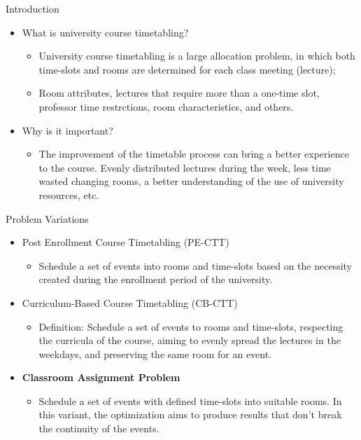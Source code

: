 \documentclass{beamer}
\begin{document}
\capa


\begin{frame}{Introduction}
\begin{itemize}
    \item What is university course timetabling? \begin{itemize}
        \item University course timetabling is a large allocation problem, in which both time-slots and rooms are determined for each class meeting (lecture);
        \item Room attributes, lectures that require more than a one-time slot, professor time restrctions, room characteristics, and others.
    \end{itemize}
    \item Why is it important?
    \begin{itemize}
        \item The improvement of the timetable process can bring a better experience to the course. Evenly distributed lectures during the week, less time wasted changing rooms, a better understanding of the use of university resources, etc.
    \end{itemize}
\end{itemize}
\end{frame}


\begin{frame}{Problem Variations}
\begin{itemize}
\item Post Enrollment Course Timetabling (PE-CTT)
    \begin{itemize}
    \item Schedule a set of events into rooms and time-slots based on the necessity created during the enrollment period of the university.
    \end{itemize}
\item Curriculum-Based Course Timetabling (CB-CTT)
    \begin{itemize}
    \item Definition: Schedule a set of events to rooms and time-slots, respecting the curricula of the course, aiming to evenly spread the lectures in the weekdays, and preserving the same room for an event.
    \end{itemize}
\item \textbf{Classroom Assignment Problem}
    \begin{itemize}
    \item Schedule a set of events with defined time-slots into suitable rooms. In this variant, the optimization aims to produce results that don't break the continuity of the events.
    \end{itemize}
\end{itemize}
\end{frame}
\end{document}
